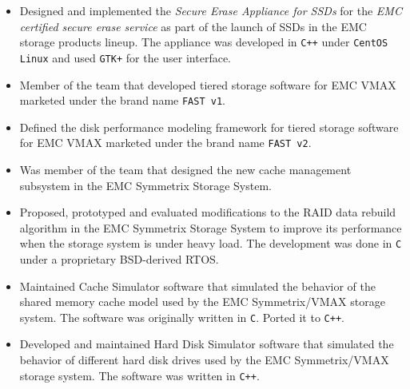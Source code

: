 { 
	\begin{itemize}
		\item Designed and implemented the {\em Secure Erase Appliance for SSDs}
			for the {\em EMC certified secure erase service} as part of the
			launch of SSDs in the EMC storage products lineup. The appliance was
			developed in \texttt{C++} under \texttt{CentOS Linux} and used 
			\texttt{GTK+} for the user interface.
		\item Member of the team that developed tiered storage software for
			EMC VMAX marketed under the brand name \texttt{FAST v1}.
		\item Defined the disk performance modeling framework for tiered storage
			software for EMC VMAX marketed under the brand name \texttt{FAST v2}.
	\end{itemize}
}
{
	\begin{itemize}
		\item Was member of the team that designed the new cache management
			subsystem in the EMC Symmetrix Storage System.
		\item Proposed, prototyped and evaluated modifications to the RAID data rebuild algorithm
			in the EMC Symmetrix Storage System to improve its performance when
			the storage system is under heavy load. The
			development was done in \texttt{C} under a proprietary BSD-derived RTOS.
		\item Maintained Cache Simulator software that simulated the behavior of the 
			shared memory cache model used by the EMC Symmetrix/VMAX storage system.
			The software was originally written in \texttt{C}. Ported it to \texttt{C++}.
		\item Developed and maintained Hard Disk Simulator software that
			simulated the behavior of different hard disk drives used by the
			EMC Symmetrix/VMAX storage system. The software was written in \texttt{C++}.
	\end{itemize}
}
